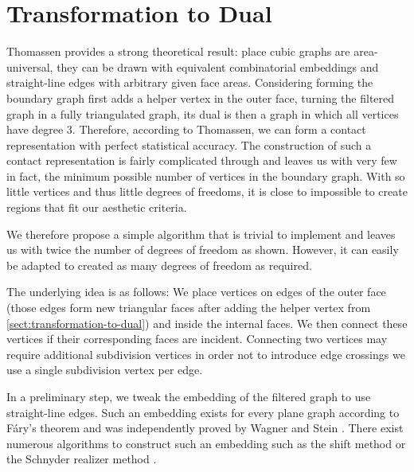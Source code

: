 \section{Transformation to Dual}
\label{sect:implementation-transformation}

Thomassen \cite{thomassen1992plane} provides a strong theoretical result: place cubic graphs are area-universal, \ie{} they can be drawn with equivalent combinatorial embeddings and straight-line edges with arbitrary given face areas. Considering forming the boundary graph first adds a helper vertex in the outer face, turning the filtered graph in a fully triangulated graph, its dual is then a graph in which all vertices have degree 3. Therefore, according to Thomassen, we can form a contact representation with perfect statistical accuracy. The construction of such a contact representation is fairly complicated through and leaves us with very few \emdash{} in fact, the minimum possible number of \emdash{} vertices in the boundary graph. With so little vertices and thus little degrees of freedoms, it is close to impossible to create regions that fit our aesthetic criteria.

We therefore propose a simple algorithm that is trivial to implement and leaves us with twice the number of degrees of freedom as shown. However, it can easily be adapted to created as many degrees of freedom as required.

The underlying idea is as follows: We place vertices on edges of the outer face (those edges form new triangular faces after adding the helper vertex from \cref{sect:transformation-to-dual}) and inside the internal faces. We then connect these vertices if their corresponding faces are incident. Connecting two vertices may require additional subdivision vertices in order not to introduce edge crossings \emdash{} we use a single subdivision vertex per edge.

In a preliminary step, we tweak the embedding of the filtered graph to use straight-line edges. Such an embedding exists for every plane graph according to Fáry's theorem \cite{fary1948straight} and was independently proved by Wagner \cite{wagner1936bemerkungen} and Stein \cite{stein1951convex}. There exist numerous algorithms to construct such an embedding \cite{vismara} such as the shift method \cite{fraysseix1990draw} or the Schnyder realizer method \cite{schnyder1990embedding} .

